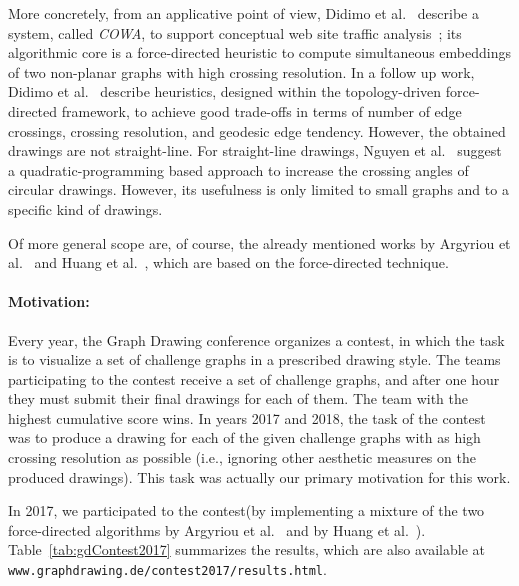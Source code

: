 \documentclass{comjnl}
\newcommand{\myparagraph}[1]{\medskip\noindent\textbf{#1}.}
\providecommand{\DIFaddtex}[1]{{\protect\color{blue}\uwave{#1}}} %
\providecommand{\DIFaddbegin}{} %
\providecommand{\DIFaddend}{} %
\providecommand{\DIFadd}[1]{\texorpdfstring{\DIFaddtex{#1}}{#1}} %
\newcommand{\DIFaddincludegraphics}[2][]{{\color{blue}\fbox{\DIFOincludegraphics[#1]{#2}}}} %
\DeclareRobustCommand{\DIFaddbegin}{\DIFOaddbegin \let\includegraphics\DIFaddincludegraphics} %
\DeclareRobustCommand{\DIFaddend}{\DIFOaddend \let\includegraphics\DIFOincludegraphics} %
\begin{document}
More concretely, from an applicative point of view, Didimo et al.~\cite{DBLP:conf/apvis/DidimoLR10} describe a system, called \emph{COWA},  to support conceptual web site traffic analysis~\cite{DBLP:conf/apvis/DidimoLR10}; its algorithmic core is a force-directed heuristic to compute simultaneous embeddings of two non-planar graphs with high crossing resolution.
%
In a follow up work, Didimo et al.~\cite{DBLP:conf/gd/DidimoLR10} describe heuristics, designed within the topology-driven force-directed framework, to achieve good trade-offs in terms of number of edge crossings, crossing resolution, and geodesic edge tendency.
%
However, the obtained drawings are not straight-line. For straight-line drawings, Nguyen et al.~\cite{DBLP:conf/gd/NguyenEHH10} suggest a quadratic-programming based approach to increase the crossing angles of circular drawings. However, its usefulness is only limited to small graphs and to a specific kind of drawings.

Of more general scope are, of course, the already mentioned works by Argyriou et al.~\cite{DBLP:journals/cj/ArgyriouBS13} and Huang et al.~\cite{DBLP:journals/vlc/HuangEHL13}, which are based on the force-directed technique.



\paragraph{Motivation:}


Every year, the Graph Drawing conference organizes a contest, in which the task is to visualize a set of challenge graphs in a prescribed drawing style. The teams participating to the contest receive a set of challenge graphs, and after one hour they must submit their final drawings for each of them. The team with the highest cumulative score wins. 
%
In years 2017 and 2018, the task of the contest was to produce a drawing for each of the given challenge graphs with as high crossing resolution as possible (i.e., ignoring other aesthetic measures on the produced drawings). This task was actually our primary motivation for this work. 

In 2017, we participated to the contest\DIFaddbegin \DIFadd{~\mbox{%
\cite{DBLP:conf/gd/DevannyKLR17} }\hspace{0pt}%
}\DIFaddend (by implementing a mixture of the two force-directed algorithms by Argyriou et al.~\cite{DBLP:journals/cj/ArgyriouBS13} and by Huang et al.~\cite{DBLP:journals/vlc/HuangEHL13}). 
%
Table~\ref{tab:gdContest2017} summarizes the results, which are also available at \texttt{www.graphdrawing.de/contest2017/results.html}. 
\end{document}
